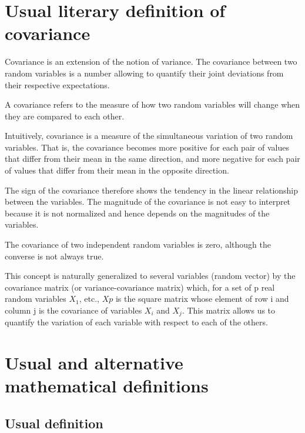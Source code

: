\documentclass[
]{report}
\begin{document}
\hypertarget{usual-literary-definition-of-covariance}{%
\section{Usual literary definition of covariance}\label{usual-literary-definition-of-covariance}}

Covariance is an extension of the notion of variance. The covariance between two random variables is a number allowing to quantify their joint deviations from their respective expectations.

A covariance refers to the measure of how two random variables will change when they are compared to each other.

Intuitively, covariance is a measure of the simultaneous variation of two random variables. That is, the covariance becomes more positive for each pair of values that differ from their mean in the same direction, and more negative for each pair of values that differ from their mean in the opposite direction.

The sign of the covariance therefore shows the tendency in the linear relationship between the variables. The magnitude of the covariance is not easy to interpret because it is not normalized and hence depends on the magnitudes of the variables.

The covariance of two independent random variables is zero, although the converse is not always true.

This concept is naturally generalized to several variables (random vector) by the covariance matrix (or variance-covariance matrix) which, for a set of p real random variables \(X_1\), etc., \(Xp\) is the square matrix whose element of row i and column j is the covariance of variables \(X_i\) and \(X_j\). This matrix allows us to quantify the variation of each variable with respect to each of the others.

\hypertarget{usual-and-alternative-mathematical-definitions}{%
\section{Usual and alternative mathematical definitions}\label{usual-and-alternative-mathematical-definitions}}

\hypertarget{usual-definition}{%
\subsection{Usual definition}\label{usual-definition}}
\end{document}
